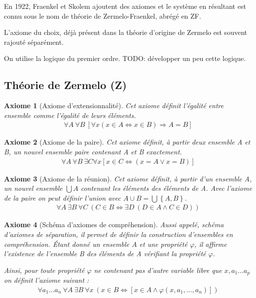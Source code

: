 \documentclass[10pt,a4paper]{article}
\newtheorem{axiom}{Axiome}[section]
\begin{document}
En 1922, Fraenkel et Skolem ajoutent des axiomes et le système en résultant est connu sous le nom de théorie de Zermelo-Fraenkel, abrégé en ZF.

L'axiome du choix, déjà présent dans la théorie d'origine de Zermelo est souvent rajouté séparément.

On utilise la logique du premier ordre.
TODO: développer un peu cette logique.

\subsection{Théorie de Zermelo (Z)}

\begin{axiom}[Axiome d'extensionnalité] Cet axiome définit l'égalité entre ensemble comme l'égalité de leurs éléments.
\begin{align}
\forall A\ \forall B \
\left[ 
\forall x \left( x \in A \Leftrightarrow x \in B  \right) \Rightarrow A = B
\right] 
\end{align}
\end{axiom}

\begin{axiom}[Axiome de la paire] Cet axiome définit, à partir deux ensemble A et B, un nouvel ensemble paire contenant A et B exactement.
\begin{align}
\forall A \ \forall B \ \exists C \forall x \left[ x \in C \Leftrightarrow \left( x = A \vee x = B \right) \right]
\end{align}
\end{axiom}

\begin{axiom}[Axiome de la réunion] Cet axiome définit, à partir d'un ensemble A, un nouvel ensemble $\bigcup A$ contenant les éléments des éléments de A. Avec l'axiome de la paire on peut définir l'union avec $A \cup B = \bigcup \left\{A, B\right\}$.
\begin{align}
\forall A\ \exists B\ \forall C\ \left( C\in B \Leftrightarrow \exists D\ \left( D\in A \wedge C\in D \right) \right)
\end{align}
\end{axiom}


\begin{axiom}[Schéma d'axiomes de compréhension] Aussi appelé, schéma d'axiomes de séparation, il permet de définir la construction d'ensembles en compréhension. Étant donné un ensemble $A$ et une propriété $\varphi$, il affirme l'existence de l'ensemble B des éléments de A vérifiant la propriété $\varphi$.

Ainsi, pour toute propriété $\varphi$ ne contenant pas d'autre variable libre que $x, a_1 \ldots a_p$ on définit l'axiome suivant :
\begin{align}
\forall a_1 \ldots a_n \ \forall A \ \exists B \ \forall x \ \left( x \in B \Leftrightarrow \left[ x \in A \wedge \varphi \left(x, a_1, \ldots, a_n \right) \right] \right) 
\end{align}
\end{axiom}
\end{document}
